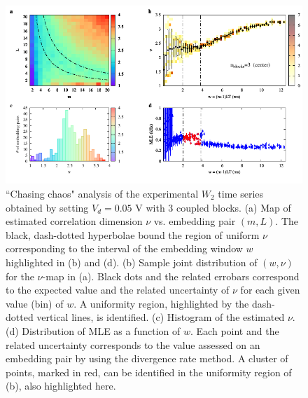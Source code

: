 \begin{figure}[H]
    \centering
    \includegraphics[width=\linewidth]{../blocks/3_blocks/middle/2e5_points/plots/chaos_low.pdf}
    \caption{``Chasing chaos" analysis of the experimental $W_2$ time series obtained by setting $V_d=0.05$ V with 3 coupled blocks.
    (a) Map of estimated correlation dimension $\nu$ vs. embedding pair $(m, L)$.
    The black, dash-dotted hyperbolae bound the region of uniform $\nu$ corresponding to the interval of the
    embedding window $w$ highlighted in (b) and (d).
    (b) Sample joint distribution of $(w,\nu)$ for the $\nu$-map in (a).
    Black dots and the related errobars correspond to the expected value and the related uncertainty of $\nu$
    for each given value (bin) of $w$. A uniformity region, highlighted by the dash-dotted vertical lines,
    is identified. (c) Histogram of the estimated $\nu$. (d) Distribution of MLE as a function of $w$. Each point and the related
    uncertainty corresponds to the value assessed on an embedding pair by using the divergence rate method.
    A cluster of points, marked in red, can be identified in the uniformity region of (b), also highlighted here.}
    \label{fig:3 blocks chaos middle}
\end{figure}


